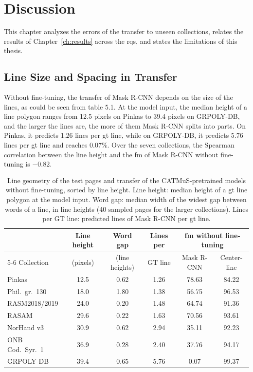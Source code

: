 \chapter{Discussion}
\label{ch:discussion}\label{sec:disc-qualitative}\label{sec:results-qualitative}

This chapter analyzes the errors of the transfer to unseen collections, relates the results of Chapter~\ref{ch:results} across the \glspl{rq}, and states the limitations of this thesis.

\section{Line Size and Spacing in Transfer}
\label{sec:disc-transfer-errors}\label{sec:results-transfer-diagnostics}

Without fine-tuning, the transfer of Mask R-CNN depends on the size of the lines, as could be seen from table 5.1. At the model input, the median height of a line polygon ranges from 12.5 pixels on Pinkas to 39.4 pixels on GRPOLY-DB, and the larger the lines are, the more of them Mask R-CNN splits into parts. On Pinkas, it predicts 1.26 lines per \gls{gt} line, while on GRPOLY-DB, it predicts 5.76 lines per \gls{gt} line and reaches 0.07\%. Over the seven collections, the Spearman correlation between the line height and the \gls{fm} of Mask R-CNN without fine-tuning is $-0.82$.

\begin{table}[htbp]
    \centering
    \caption[Line geometry and transfer without fine-tuning]{Line geometry of the test pages and transfer of the CATMuS-pretrained models without fine-tuning, sorted by line height. Line height: median height of a \gls{gt} line polygon at the model input. Word gap: median width of the widest gap between words of a line, in line heights (40 sampled pages for the larger collections). Lines per GT line: predicted lines of Mask R-CNN per \gls{gt} line.}
    \label{tab:rq3-zeroshot-scale}
    \small
    \begin{tabular}{@{}lccccc@{}}
        \toprule
        & Line height & Word gap & Lines per & \multicolumn{2}{c}{\gls{fm} without fine-tuning} \\
        \cmidrule(l){5-6}
        Collection & (pixels) & (line heights) & GT line & Mask R-CNN & Center-line \\
        \midrule
        Pinkas & 12.5 & 0.62 & 1.26 & 78.63 & 84.22 \\
        Phil.\ gr.\ 130 & 18.0 & 1.80 & 1.38 & 56.75 & 96.53 \\
        RASM2018/2019 & 24.0 & 0.20 & 1.48 & 64.74 & 91.36 \\
        RASAM & 29.6 & 0.22 & 1.63 & 70.56 & 93.61 \\
        NorHand v3 & 30.9 & 0.62 & 2.94 & 35.11 & 92.23 \\
        ONB Cod.\ Syr.\ 1 & 36.9 & 0.28 & 2.40 & 37.76 & 94.17 \\
        GRPOLY-DB & 39.4 & 0.65 & 5.76 & 0.07 & 99.37 \\
        \bottomrule
    \end{tabular}
\end{table}

